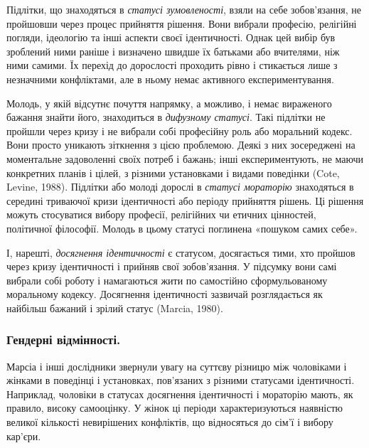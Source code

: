 \documentclass[a4paper,12pt, titlepage]{article}
\begin{document}
    Підлітки, що знаходяться в \textit{статусі зумовленості}, взяли на себе
    зобов'язання, не пройшовши через процес прийняття рішення. Вони вибрали
    професію, релігійні погляди, ідеологію та інші аспекти своєї
    ідентичності. Однак цей вибір був зроблений ними раніше і визначено швидше
    їх батьками або вчителями, ніж ними самими. Їх перехід до дорослості
    проходить рівно і стикається лише з незначними конфліктами, але в
    ньому немає активного експериментування.

    Молодь, у якій відсутнє почуття напрямку, а можливо, і
    немає вираженого бажання знайти його, знаходиться в \textit{дифузному статусі}.
    Такі підлітки не пройшли через кризу і не вибрали собі
    професійну роль або моральний кодекс. Вони просто уникають
    зіткнення з цією проблемою. Деякі з них зосереджені на
    моментальне задоволенні своїх потреб і бажань; інші
    експериментують, не маючи конкретних планів і цілей, з різними
    установками і видами поведінки (Cote, Levine, 1988).
    Підлітки або молоді дорослі в \textit{статусі мораторію} знаходяться в
    середині триваючої кризи ідентичності або періоду прийняття
    рішень. Ці рішення можуть стосуватися вибору професії, релігійних чи
    етичних цінностей, політичної філософії. Молодь в цьому статусі
    поглинена «пошуком самих себе».

    І, нарешті, \textit{досягнення ідентичності} є статусом,
    досягається тими, хто пройшов через кризу ідентичності і прийняв свої
    зобов'язання. У підсумку вони самі вибрали собі роботу і намагаються жити по
    самостійно сформульованому моральному кодексу. Досягнення
    ідентичності зазвичай розглядається як найбільш бажаний і зрілий
    статус (Marcia, 1980).

    \subsubsection{Гендерні відмінності.}
    Марсіа і інші дослідники звернули увагу на суттєву різницю між чоловіками і жінками в
    поведінці і установках, пов'язаних з різними статусами ідентичності.
    Наприклад, чоловіки в статусах досягнення ідентичності і мораторію
    мають, як правило, високу самооцінку. У жінок ці періоди
    характеризуються наявністю великої кількості невирішених конфліктів,
    що відносяться до сім'ї і вибору кар'єри.
\end{document}
